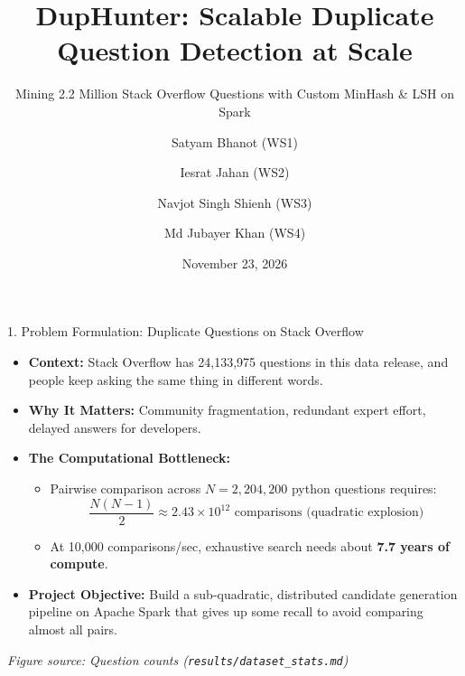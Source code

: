 \documentclass[aspectratio=169,10pt]{beamer}
\title[DupHunter: Scalable Duplicate Detection]{DupHunter: Scalable Duplicate Question Detection at Scale}
\subtitle{Mining 2.2 Million Stack Overflow Questions with Custom MinHash \& LSH on Spark}
\author[ENSF 612 Team]{
  Satyam Bhanot (WS1) \and
  Iesrat Jahan (WS2) \and
  Navjot Singh Shienh (WS3) \and
  Md Jubayer Khan (WS4)
}
\institute[UCalgary]{ENSF 612: Big Data Analytics --- Final Presentation}
\date{November 23, 2026}
\begin{document}
\begin{frame}
  \titlepage
\end{frame}


\begin{frame}{1. Problem Formulation: Duplicate Questions on Stack Overflow}
  \begin{itemize}
    \item \textbf{Context:} Stack Overflow has 24,133,975 questions in this data release, and people keep asking the same thing in different words.
    \item \textbf{Why It Matters:} Community fragmentation, redundant expert effort, delayed answers for developers.
    \item \textbf{The Computational Bottleneck:}
      \begin{itemize}
        \item Pairwise comparison across $N = 2{,}204{,}200$ python questions requires:
          \[ \frac{N(N-1)}{2} \approx 2.43 \times 10^{12} \text{ comparisons (quadratic explosion)} \]
        \item At 10,000 comparisons/sec, exhaustive search needs about \textbf{7.7 years of compute}.
      \end{itemize}
    \item \textbf{Project Objective:} Build a sub-quadratic, distributed candidate generation pipeline on Apache Spark that gives up some recall to avoid comparing almost all pairs.
  \end{itemize}
  \vfill
  \footnotesize{\textit{Figure source: Question counts (\texttt{results/dataset\_stats.md})}}
\end{frame}
\end{document}
